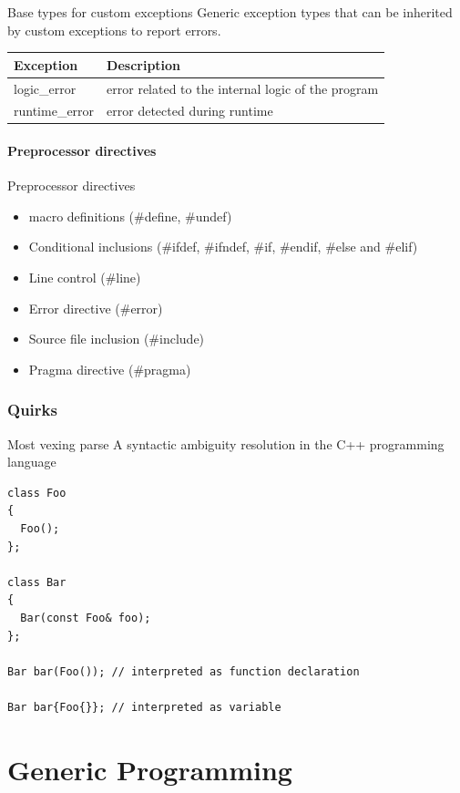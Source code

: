 \documentclass{beamer}
\begin{document}
\begin{frame}{Base types for custom exceptions}
Generic exception types that can be inherited by custom exceptions to report
errors.
\begin{table}
\begin{tabular}{l | l }
Exception & Description \\
\hline
logic\_error & error related to the internal logic of the program \\
runtime\_error & error detected during runtime
\end{tabular}
\end{table}
\end{frame}

\subsection{Preprocessor directives}
\begin{frame}{Preprocessor directives}
\begin{itemize}
  \item macro definitions (\#define, \#undef)
  \item Conditional inclusions (\#ifdef, \#ifndef, \#if, \#endif, \#else and \#elif)
  \item Line control (\#line)
  \item Error directive (\#error)
  \item Source file inclusion (\#include)
  \item Pragma directive (\#pragma)
\end{itemize}
\end{frame}

\section{Quirks}

\begin{frame}[fragile]{Most vexing parse}
A syntactic ambiguity resolution in the C++ programming language
\begin{lstlisting}
class Foo
{
  Foo();
};

class Bar
{
  Bar(const Foo& foo);
};

Bar bar(Foo()); // interpreted as function declaration

Bar bar{Foo{}}; // interpreted as variable
\end{lstlisting}
\end{frame}


\part{Generic Programming}
\end{document}
